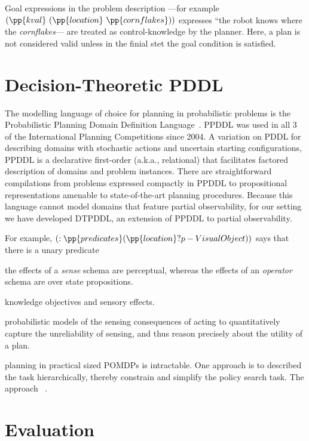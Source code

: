 \documentclass[letterpaper]{article}
\begin{document}
Goal expressions in the problem description ---for example
$(\pp{kval}~(\pp{location}~\pp{cornflakes}))$ expresses ``the robot
knows where the {\em cornflakes}--- are treated as control-knowledge
by the planner. Here, a plan is not considered valid unless in the
finial stet the goal condition is satisfied.


\section{Decision-Theoretic PDDL}

The modelling language of choice for planning in probabilistic
problems is the Probabilistic Planning Domain Definition
Language~\cite{younes:littman:04}. PPDDL was used in all 3 of the
International Planning Competitions since 2004. A variation on PDDL
for describing domains with stochastic actions and uncertain starting
configurations, PPDDL is a declarative first-order (a.k.a.,
relational) that facilitates factored description of domains and
problem instances. There are straightforward compilations from
problems expressed compactly in PPDDL to propositional representations
amenable to state-of-the-art planning procedures.  Because this
language cannot model domains that feature partial observability, for
our setting we have developed DTPDDL, an extension of PPDDL to partial
observability.

For example, $(:\pp{predicates} (\pp{location} ?p - VisualObject))$
says that there is a unary predicate 




the effects of a {\em sense} schema are perceptual, whereas the
effects of an {\em operator} schema are over state propositions.


knowledge objectives and  sensory effects. 


probabilistic models of the sensing consequences of acting to
quantitatively capture the unreliability of sensing, and thus reason
precisely about the utility of a plan. 


planning in practical sized POMDPs is intractable. One approach is to
described the task hierarchically, thereby constrain and simplify the
policy search task. The approach ~\cite{}. 






\section{Evaluation}
\end{document}
